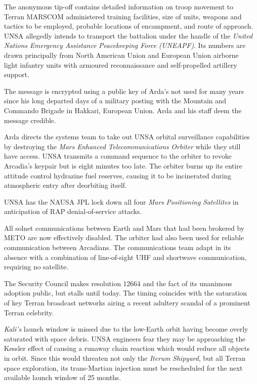 \stopitemize

\stopTimelineCorrespondenceDocument

The anonymous tip-off contains detailed information on troop movement to Terran MARSCOM administered training facilities, size of units, weapons and tactics to be employed, probable locations of encampment, and route of approach. UNSA allegedly intends to transport the battalion under the handle of the {\it United Nations Emergency Assistance Peacekeeping Force (UNEAPF)}. Its numbers are drawn principally from North American Union and European Union airborne light infantry units with armoured reconnaissance and self-propelled artillery support.

The message is encrypted using a public key of Arda's not used for many years since his long departed days of a military posting with the Mountain and Commando Brigade in Hakkari, European Union. Arda and his staff deem the message credible.
\StopTimelineDate

Arda directs the systems team to take out UNSA orbital surveillance capabilities by destroying the {\it Mars Enhanced Telecommunications Orbiter} while they still have access. UNSA transmits a command sequence to the orbiter to revoke Arcadia's keypair but is eight minutes too late. The orbiter burns up its entire attitude control hydrazine fuel reserves, causing it to be incinerated during atmospheric entry after deorbiting itself.

UNSA has the NAUSA JPL lock down all four {\it Mars Positioning Satellites} in anticipation of RAP denial-of-service attacks.

All solnet communications between Earth and Mars that had been brokered by METO are now effectively disabled. The orbiter had also been used for reliable communication between Arcadians. The communications team adapt in its absence with a combination of line-of-sight UHF and shortwave communication, requiring no satellite.
\StopTimelineDate

The Security Council makes resolution 12664 and the fact of its unanimous adoption public, but stalls until today. The timing coincides with the saturation of key Terran broadcast networks airing a recent adultery scandal of a prominent Terran celebrity.
\StopTimelineDate

{\it Kali's} launch window is missed due to the low-Earth orbit having become overly saturated with space debris. UNSA engineers fear they may be approaching the Kessler effect of causing a runaway chain reaction which would reduce all objects in orbit. Since this would threaten not only the {\it Iterum Shipyard}, but all Terran space exploration, its trans-Martian injection must be rescheduled for the next available launch window of 25 months.
\StopTimelineDate

